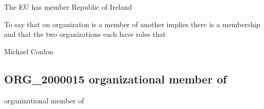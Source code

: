 \documentclass[letterpaper,10pt,english]{sphinxmanual}
\begin{document}
\begin{sphinxShadowBox}

\sphinxAtStartPar
{\hyperref[\detokenize{doc-ORG_0000001::doc}]{}}
\end{sphinxShadowBox}

\begin{sphinxShadowBox}

\sphinxAtStartPar
{\hyperref[\detokenize{doc-ORG_0000001::doc}]{}}
\end{sphinxShadowBox}

\begin{sphinxShadowBox}

\sphinxAtStartPar
{\hyperref[\detokenize{doc-ORG_2000015::doc}]{}}
\end{sphinxShadowBox}

\begin{sphinxShadowBox}

\sphinxAtStartPar
The EU has member Republic of Ireland
\end{sphinxShadowBox}

\begin{sphinxShadowBox}

\sphinxAtStartPar
To say that on organizaton is a member of another implies there is a membership and that the two organizations each have  roles that
\end{sphinxShadowBox}

\begin{sphinxShadowBox}

\sphinxAtStartPar
Michael Conlon 
\end{sphinxShadowBox}
\begin{quote}

\ignorespaces \end{quote}


\subsection{ORG\_2000015 \sphinxhyphen{} organizational member of}
\label{\detokenize{doc-ORG_2000015:org-2000015-organizational-member-of}}\label{\detokenize{doc-ORG_2000015:index-0}}\label{\detokenize{doc-ORG_2000015::doc}}
\begin{sphinxShadowBox}

\sphinxAtStartPar
organizational member of
\end{sphinxShadowBox}
\end{document}
